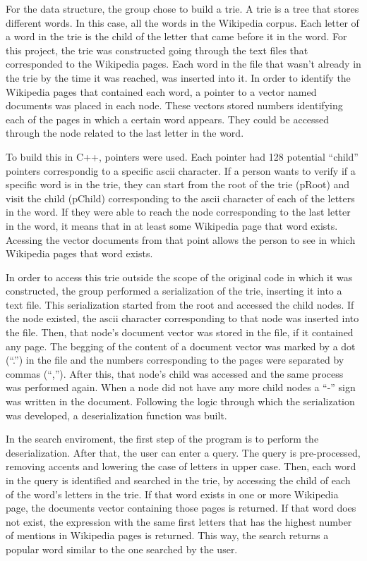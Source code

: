 \documentclass{article}
\begin{document}
For the data structure, the group chose to build a trie. A trie is a tree that stores different words. In this case, all the words in the Wikipedia corpus. Each letter of a word in the trie is the child of the letter that came before it in the word. 
For this project, the trie was constructed going through the text files that corresponded to the Wikipedia pages. Each word in the file that wasn't already in the trie by the time it was reached, was inserted into it. In order to identify the Wikipedia pages that contained each word, a pointer to a vector named documents was placed in each node. These vectors stored numbers identifying each of the pages in which a certain word appears. They could be accessed through the node related to the last letter in the word. 

To build this in C++, pointers were used. Each pointer had 128 potential ``child'' pointers correspondig to a specific ascii character. If a person wants to verify if a specific word is in the trie, they can start from the root of the trie (pRoot) and visit the child (pChild) corresponding to the ascii character of each of the letters in the word. If they were able to reach the node corresponding to the last letter in the word, it means that in at least some Wikipedia page that word exists. Acessing the vector documents from that point allows the person to see in which Wikipedia pages that word exists.


In order to access this trie outside the scope of the original code in which it was constructed, the group performed a serialization of the trie, inserting it into a text file. This serialization started from the root and accessed the child nodes. If the node existed, the ascii character corresponding to that node was inserted into the file. Then, that node's  document vector was stored in the file, if it contained any page. The begging of the content of a document vector was marked by a dot (``.'') in the file and the numbers corresponding to the pages were separated by commas (``,''). After this, that node's child was accessed and the same process was performed again. When a node did not have any more child nodes a ``-'' sign was written in the document. Following the logic through which the serialization was developed, a deserialization function was built. 

In the search enviroment, the first step of the program is to perform the deserialization. After that, the user can enter a query.  The query is pre-processed, removing accents and lowering the case of letters in upper case. Then, each word in the query is identified and searched in the trie, by accessing the child of each of the word's letters in the trie. If that word exists in one or more Wikipedia page, the documents vector containing those pages is returned. If that word does not exist, the expression with the same first letters that has the highest number of mentions in Wikipedia pages is returned. This way, the search returns a popular word similar to the one searched by the user. 
\end{document}
